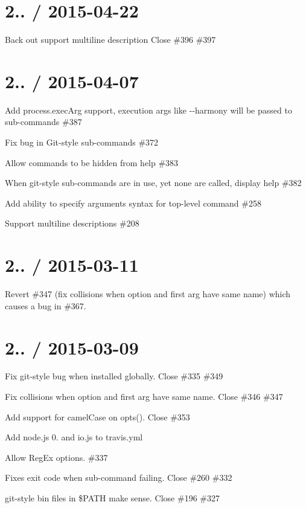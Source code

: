 \section*{2.. / 2015-\/04-\/22 }


\begin{DoxyItemize}
\item Back out {\ttfamily support multiline description} Close \#396 \#397
\end{DoxyItemize}

\section*{2.. / 2015-\/04-\/07 }


\begin{DoxyItemize}
\item Add {\ttfamily process.\+exec\+Arg} support, execution args like {\ttfamily -\/-\/harmony} will be passed to sub-\/commands \#387  
\item Fix bug in Git-\/style sub-\/commands \#372 
\item Allow commands to be hidden from help \#383 
\item When git-\/style sub-\/commands are in use, yet none are called, display help \#382 
\item Add ability to specify arguments syntax for top-\/level command \#258 
\item Support multiline descriptions \#208 
\end{DoxyItemize}

\section*{2.. / 2015-\/03-\/11 }


\begin{DoxyItemize}
\item Revert \#347 (fix collisions when option and first arg have same name) which causes a bug in \#367.
\end{DoxyItemize}

\section*{2.. / 2015-\/03-\/09 }


\begin{DoxyItemize}
\item Fix git-\/style bug when installed globally. Close \#335 \#349 
\item Fix collisions when option and first arg have same name. Close \#346 \#347 
\item Add support for camel\+Case on {\ttfamily opts()}. Close \#353 
\item Add node.\+js 0. and io.\+js to travis.\+yml
\item Allow Reg\+Ex options. \#337 
\item Fixes exit code when sub-\/command failing. Close \#260 \#332 
\item git-\/style {\ttfamily bin} files in \$\+P\+A\+TH make sense. Close \#196 \#327 
\end{DoxyItemize}

